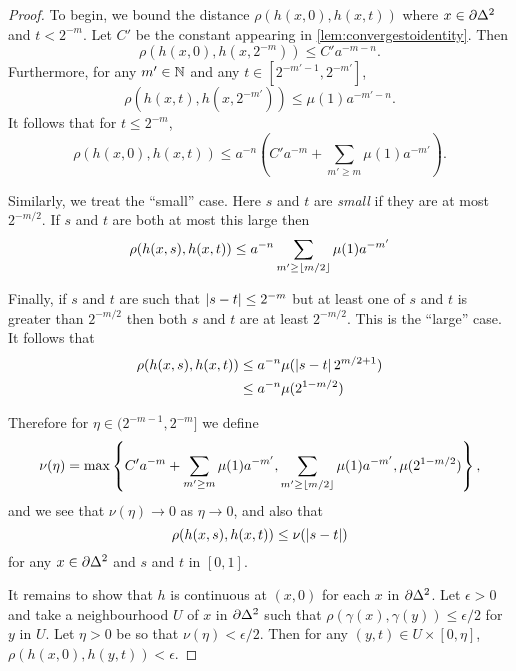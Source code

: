 \documentclass[a4paper]{article}
\begin{document}
\begin{proof}
  To begin, we bound the distance $\rho(h(x,0), h(x,t))$
  where $x \in \partial \Delta^2$ and $t < 2^{-m}$. Let $C'$ be the
  constant appearing in \cref{lem:convergestoidentity}. Then 
  \begin{equation*}
    \rho(h(x,0), h(x,2^{-m})) \leq C'a^{-m-n}.
  \end{equation*}
  Furthermore, for any $m' \in \mathbb{N}$ and any $t \in [2^{-m'-1}, 2^{-m'}]$,
  \begin{equation*}
    \rho(h(x,t), h(x,2^{-m'})) \leq \mu(1)a^{-m'-n}.
  \end{equation*}
  It follows that for $t \leq 2^{-m}$,
  \begin{equation*}
    \rho(h(x,0), h(x,t)) \leq a^{-n}\left(C'a^{-m} + \sum_{m' \geq m}
          \mu(1)a^{-m'}\right).
  \end{equation*}

  Similarly, we treat the ``small'' case. Here $s$ and $t$ are \emph{small} if
  they are at most $2^{-m/2}$. If $s$ and $t$ are both at most this large
  then
  \begin{equation*}
    \rho(h(x,s), h(x,t)) \leq a^{-n} \sum_{m' \geq \lfloor m/2\rfloor} \mu(1) a^{-m'}
  \end{equation*}

  Finally, if $s$ and $t$ are such that $\left|s-t\right| \leq 2^{-m}$ but at least
  one of $s$ and $t$ is greater than $2^{-m/2}$ then both $s$ and $t$ are at
  least $2^{-m/2}$. This is the ``large'' case. It follows that 
  \begin{align*}
    \rho(h(x,s), h(x,t)) &\leq a^{-n} \mu(\left|s-t\right| 2^{m/2 + 1}) \\
                         &\leq a^{-n} \mu(2^{1-m/2})
  \end{align*}
  
  Therefore for $\eta \in (2^{-m-1}, 2^{-m}]$ we define
  \begin{equation*}
    \nu(\eta)  = \max\left\{
      C'a^{-m} + \sum_{m' \geq m} \mu(1)a^{-m'},
      \sum_{m' \geq \lfloor m/2\rfloor} \mu(1) a^{-m'},
      \mu(2^{1-m/2})
    \right\},
  \end{equation*}
  and we see that $\nu(\eta) \to 0$ as $\eta \to 0$, and also that
  \begin{equation*}
    \rho(h(x,s), h(x,t)) \leq \nu(\left|s-t\right|)
  \end{equation*}
  for any $x \in \partial\Delta^2$ and $s$ and $t$ in $[0,1]$.

  It remains to show that $h$ is continuous at $(x,0)$ for each $x$ in
  $\partial\Delta^2$. Let $\epsilon > 0$ and take a neighbourhood $U$ of
  $x$ in $\partial\Delta^2$ such that $\rho(\gamma(x), \gamma(y)) \leq
  \epsilon/2$ for $y$ in $U$. Let $\eta > 0$ be so that $\nu(\eta) <
  \epsilon/2$. Then for any $(y, t) \in U \times [0, \eta]$, $\rho(h(x,0),
  h(y,t)) < \epsilon$.
\end{proof}
\end{document}
